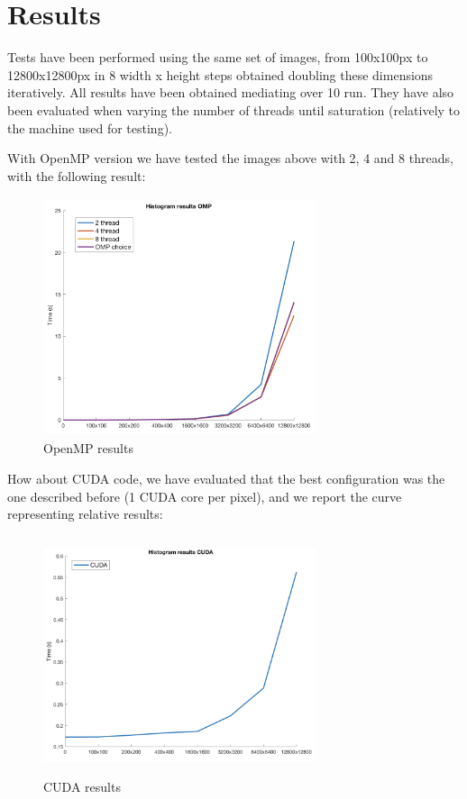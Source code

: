 \documentclass[10pt,twocolumn,letterpaper]{article}
\begin{document}
\section{Results}
Tests have been performed using the same set of images, from 100x100px to 12800x12800px in 8 width x height steps obtained doubling these dimensions iteratively. All results have been obtained mediating over 10 run. They have also been evaluated when varying the number of threads until saturation (relatively to the machine used for testing). 

With OpenMP version we have tested the images above with 2, 4 and 8 threads, with the following result:
\begin{figure}[h]
	\centering
	\includegraphics[width=8cm, height=7cm]{res_OMP}
	\caption{OpenMP results}
	\label{fig:OMP}
\end{figure}

How about CUDA code, we have evaluated that the best configuration was the one described before (1 CUDA core per pixel), and we report the curve representing relative results:
\begin{figure}[h]
	\centering
	\includegraphics[width=8cm, height=7cm]{res_CUDA}
	\caption{CUDA results}
	\label{fig:CUDA}
\end{figure}
\end{document}
